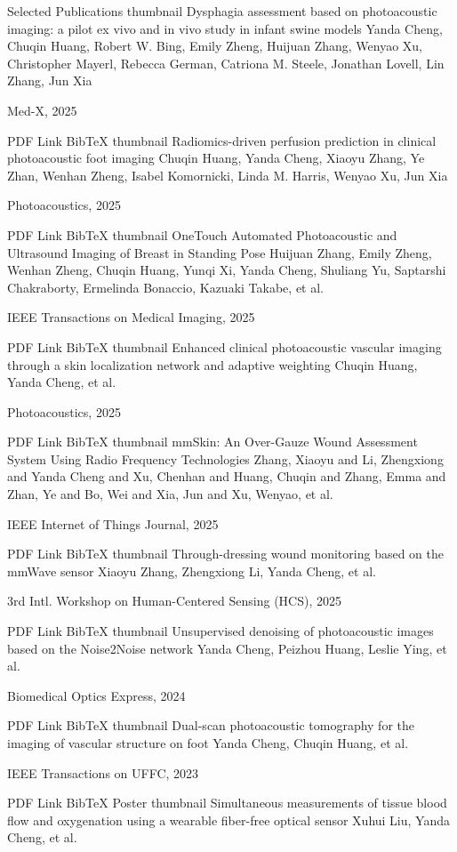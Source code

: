 Selected Publications
thumbnail
Dysphagia assessment based on photoacoustic imaging: a pilot ex vivo and in vivo study in infant swine models
Yanda Cheng, Chuqin Huang, Robert W. Bing, Emily Zheng, Huijuan Zhang, Wenyao Xu, Christopher Mayerl, Rebecca German, Catriona M. Steele, Jonathan Lovell, Lin Zhang, Jun Xia

Med-X, 2025

PDF Link BibTeX
thumbnail
Radiomics-driven perfusion prediction in clinical photoacoustic foot imaging
Chuqin Huang, Yanda Cheng, Xiaoyu Zhang, Ye Zhan, Wenhan Zheng, Isabel Komornicki, Linda M. Harris, Wenyao Xu, Jun Xia

Photoacoustics, 2025

PDF Link BibTeX
thumbnail
OneTouch Automated Photoacoustic and Ultrasound Imaging of Breast in Standing Pose
Huijuan Zhang, Emily Zheng, Wenhan Zheng, Chuqin Huang, Yunqi Xi, Yanda Cheng, Shuliang Yu, Saptarshi Chakraborty, Ermelinda Bonaccio, Kazuaki Takabe, et al.

IEEE Transactions on Medical Imaging, 2025

PDF Link BibTeX
thumbnail
Enhanced clinical photoacoustic vascular imaging through a skin localization network and adaptive weighting
Chuqin Huang, Yanda Cheng, et al.

Photoacoustics, 2025

PDF Link BibTeX
thumbnail
mmSkin: An Over-Gauze Wound Assessment System Using Radio Frequency Technologies
Zhang, Xiaoyu and Li, Zhengxiong and Yanda Cheng and Xu, Chenhan and Huang, Chuqin and Zhang, Emma and Zhan, Ye and Bo, Wei and Xia, Jun and Xu, Wenyao, et al.

IEEE Internet of Things Journal, 2025

PDF Link BibTeX
thumbnail
Through-dressing wound monitoring based on the mmWave sensor
Xiaoyu Zhang, Zhengxiong Li, Yanda Cheng, et al.

3rd Intl. Workshop on Human-Centered Sensing (HCS), 2025

PDF Link BibTeX
thumbnail
Unsupervised denoising of photoacoustic images based on the Noise2Noise network
Yanda Cheng, Peizhou Huang, Leslie Ying, et al.

Biomedical Optics Express, 2024

PDF Link BibTeX
thumbnail
Dual-scan photoacoustic tomography for the imaging of vascular structure on foot
Yanda Cheng, Chuqin Huang, et al.

IEEE Transactions on UFFC, 2023

PDF Link BibTeX Poster
thumbnail
Simultaneous measurements of tissue blood flow and oxygenation using a wearable fiber-free optical sensor
Xuhui Liu, Yanda Cheng, et al.

